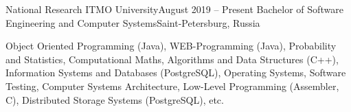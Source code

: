 
\begin{cvHeadingList}

  \cvCustomHeading
    {National Research ITMO University}{August 2019 – Present}
    {Bachelor of Software Engineering and Computer Systems}{Saint-Petersburg, Russia}

  \begin{cvList}
    \cvItem[Cources]
      Object Oriented Programming (Java),
      WEB-Programming (Java),
      Probability and Statistics,
      Computational Maths,
      Algorithms and Data Structures (C++),
      Information Systems and Databases (PostgreSQL),
      Operating Systems,
      Software Testing,
      Computer Systems Architecture,
      Low-Level Programming (Assembler, C),
      Distributed Storage Systems (PostgreSQL), etc.
  \end{cvList}

\end{cvHeadingList}
